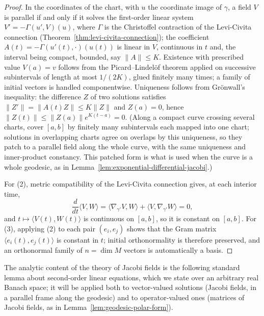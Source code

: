 \begin{proof}
\leanok
In the coordinates of the chart, with $u$ the coordinate image of
$\gamma$, a field $V$ is parallel if and only if it solves the
first-order linear system $V'=-\Gamma(u',V)(u)$, where
$\Gamma$ is the Christoffel contraction of the Levi-Civita
connection (Theorem~\ref{thm:levi-civita-connection}); the
coefficient $A(t)=-\Gamma(u'(t),\cdot)(u(t))$ is linear in $V$,
continuous in $t$ and, the interval being compact, bounded, say
$\|A\|\le K$. Existence with prescribed value $V(a)=v$ follows from
the Picard--Lindel\"of theorem applied on successive subintervals of
length at most $1/(2K)$, glued finitely many times; a family of
initial vectors is handled componentwise. Uniqueness follows from
Gr\"onwall's inequality: the difference $Z$ of two solutions
satisfies $\|Z'\|=\|A(t)Z\|\le K\|Z\|$ and $Z(a)=0$, hence
$\|Z(t)\|\le\|Z(a)\|e^{K(t-a)}=0$. (Along a compact curve crossing
several charts, cover $[a,b]$ by finitely many subintervals each
mapped into one chart; solutions in overlapping charts agree on
overlaps by this uniqueness, so they patch to a parallel field
along the whole curve, with the same uniqueness and inner-product
constancy. This patched form is what is used when the curve is a
whole geodesic, as in
Lemma~\ref{lem:exponential-differential-jacobi}.)

For (2), metric compatibility of the Levi-Civita connection gives,
at each interior time,
$$\frac{d}{dt}\langle V,W\rangle
=\langle\nabla_{\gamma'}V,W\rangle
+\langle V,\nabla_{\gamma'}W\rangle=0,$$
and $t\mapsto\langle V(t),W(t)\rangle$ is continuous on $[a,b]$, so
it is constant on $[a,b]$. For (3), applying (2) to each pair
$(e_i,e_j)$ shows that the Gram matrix
$\langle e_i(t),e_j(t)\rangle$ is constant in $t$; initial
orthonormality is therefore preserved, and an orthonormal family of
$n=\dim M$ vectors is automatically a basis.
\end{proof}

The analytic content of the theory of Jacobi fields is the following
standard lemma about second-order linear equations, which we state
over an arbitrary real Banach space; it will be applied both to
vector-valued solutions (Jacobi fields, in a parallel frame along the
geodesic) and to operator-valued ones (matrices of Jacobi fields, as
in Lemma~\ref{lem:geodesic-polar-form}).

